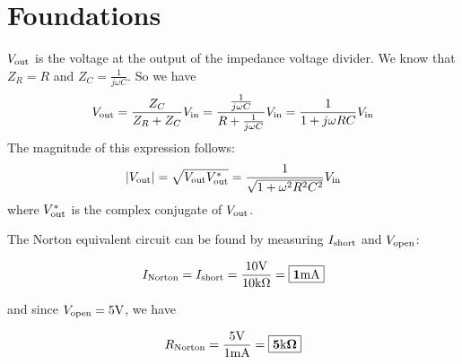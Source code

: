 \section{Foundations}


    $V_{\text{out}}$ is the voltage at the output of the impedance voltage divider. We know that $Z_R = R$ and $Z_C = \frac{1}{j\omega C}$. So we have 
    \[V_{\text{out}} = \frac{Z_C}{Z_R + Z_C} V_{\text{in}} = \frac{\frac{1}{j \omega C}}{R + \frac{1}{j \omega C}} V_{\text{in}} = \frac{1}{1 + j \omega R C} V_{\text{in}}\]
    The magnitude of this expression follows:
    \[|V_{\text{out}}| = \sqrt{V_{\text{out}} V_{\text{out}}^*} = \frac{1}{\sqrt{1 + \omega^2R^2C^2}}V_{\text{in}}\]
    where $V_{\text{out}}^*$ is the complex conjugate of $V_{\text{out}}$.
    

    The Norton equivalent circuit can be found by measuring $I_{\text{short}}$ and $V_{\text{open}}$:
    
    \[I_{\text{Norton}} = I_{\text{short}} = \frac{10\text{V}}{10\text{k}\Omega} = \boxed{\mathbf{1\text{m}\text{A}}}\] 
    
    and since $V_{\text{open}} = 5\text{V}$, we have
    
    \[R_{\text{Norton}} = \frac{5\text{V}}{1\text{m}\text{A}} = \boxed{\mathbf{5\text{k}\Omega}}\]
